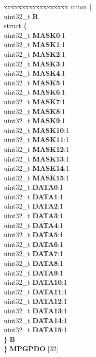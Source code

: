 \begin{DoxyCompactItemize}
\begin{tabbing}
\end{tabbing}\item 
\mbox{\label{structSIU__tag_a67bf31c6dea7cec47e2e7a6faf6e6c46}} 
\begin{tabbing}
xx\=xx\=xx\=xx\=xx\=xx\=xx\=xx\=xx\=\kill
union \{\\
\>uint32\_t {\bfseries R}\\
\>struct \{\\
\>\>uint32\_t {\bfseries MASK0}:1\\
\>\>uint32\_t {\bfseries MASK1}:1\\
\>\>uint32\_t {\bfseries MASK2}:1\\
\>\>uint32\_t {\bfseries MASK3}:1\\
\>\>uint32\_t {\bfseries MASK4}:1\\
\>\>uint32\_t {\bfseries MASK5}:1\\
\>\>uint32\_t {\bfseries MASK6}:1\\
\>\>uint32\_t {\bfseries MASK7}:1\\
\>\>uint32\_t {\bfseries MASK8}:1\\
\>\>uint32\_t {\bfseries MASK9}:1\\
\>\>uint32\_t {\bfseries MASK10}:1\\
\>\>uint32\_t {\bfseries MASK11}:1\\
\>\>uint32\_t {\bfseries MASK12}:1\\
\>\>uint32\_t {\bfseries MASK13}:1\\
\>\>uint32\_t {\bfseries MASK14}:1\\
\>\>uint32\_t {\bfseries MASK15}:1\\
\>\>uint32\_t {\bfseries DATA0}:1\\
\>\>uint32\_t {\bfseries DATA1}:1\\
\>\>uint32\_t {\bfseries DATA2}:1\\
\>\>uint32\_t {\bfseries DATA3}:1\\
\>\>uint32\_t {\bfseries DATA4}:1\\
\>\>uint32\_t {\bfseries DATA5}:1\\
\>\>uint32\_t {\bfseries DATA6}:1\\
\>\>uint32\_t {\bfseries DATA7}:1\\
\>\>uint32\_t {\bfseries DATA8}:1\\
\>\>uint32\_t {\bfseries DATA9}:1\\
\>\>uint32\_t {\bfseries DATA10}:1\\
\>\>uint32\_t {\bfseries DATA11}:1\\
\>\>uint32\_t {\bfseries DATA12}:1\\
\>\>uint32\_t {\bfseries DATA13}:1\\
\>\>uint32\_t {\bfseries DATA14}:1\\
\>\>uint32\_t {\bfseries DATA15}:1\\
\>\} {\bfseries B}\\
\} {\bfseries MPGPDO} \mbox{[}32\mbox{]}\\


\end{tabbing}
\end{DoxyCompactItemize}
